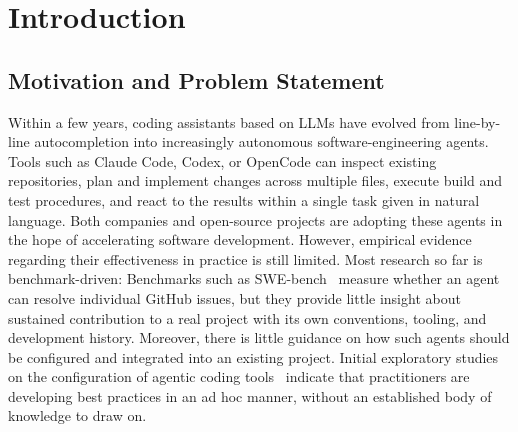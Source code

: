 \section{Introduction}
\label{sec:introduction}

\subsection{Motivation and Problem Statement}

Within a few years, coding assistants based on \acfp{LLM} have evolved from line-by-line autocompletion into increasingly autonomous software-engineering agents. Tools such as Claude Code, Codex, or OpenCode can inspect existing repositories, plan and implement changes across multiple files, execute build and test procedures, and react to the results within a single task given in natural language. Both companies and open-source projects are adopting these agents in the hope of accelerating software development. However, empirical evidence regarding their effectiveness in practice is still limited. Most research so far is benchmark-driven: Benchmarks such as SWE-bench~\cite{Jimenez2023SWEbenchCL} measure whether an agent can resolve individual GitHub issues, but they provide little insight about sustained contribution to a real project with its own conventions, tooling, and development history. Moreover, there is little guidance on how such agents should be configured and integrated into an existing project. Initial exploratory studies on the configuration of agentic coding tools~\cite{Galster2026ConfiguringAA, Lulla2026OnTI, Lulla2026TheIO} indicate that practitioners are developing best practices in an ad hoc manner, without an established body of knowledge to draw on.

